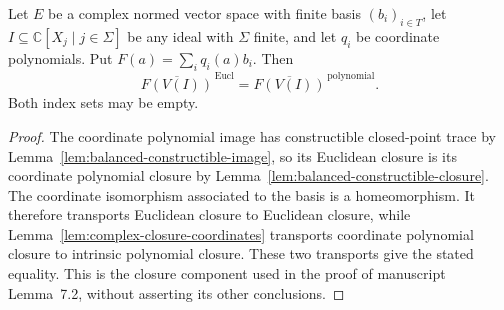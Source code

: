 \begin{theorem}
\label{thm:complex-polynomial-image-closure}
\leanok
Let $E$ be a complex normed vector space with finite basis $(b_i)_{i\in T}$,
let $I\subseteq\mathbb C[X_j\mid j\in\Sigma]$ be any ideal with $\Sigma$
finite, and let $q_i$ be coordinate polynomials. Put
$F(a)=\sum_i q_i(a)b_i$. Then
\[
 \overline{F(V(I))}^{\,\mathrm{Eucl}}
 =\overline{F(V(I))}^{\,\mathrm{polynomial}}.
\]
Both index sets may be empty.
\end{theorem}
\begin{proof}
The coordinate polynomial image has constructible closed-point trace by
Lemma~\ref{lem:balanced-constructible-image}, so its Euclidean closure
is its coordinate polynomial closure by
Lemma~\ref{lem:balanced-constructible-closure}. The coordinate isomorphism
associated to the basis is a homeomorphism. It therefore transports
Euclidean closure to Euclidean closure, while
Lemma~\ref{lem:complex-closure-coordinates} transports coordinate
polynomial closure to intrinsic polynomial closure. These two transports
give the stated equality. This is the closure component used in the proof
of manuscript Lemma~7.2, without asserting its other conclusions.
\end{proof}
